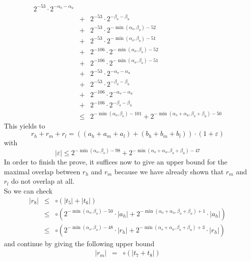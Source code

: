 \documentclass[a4paper,10pt,twoside]{article}
\newenvironment{proof}[1][Proof]{\begin{trivlist}
\item[\hskip \labelsep {\bfseries #1}]}{\end{trivlist}}
\newcommand{\hi}{\ensuremath{\mathit{h}}}
\newcommand{\mi}{\ensuremath{\mathit{m}}}
\newcommand{\lo}{\ensuremath{\mathit{l}}}
\renewcommand{\epsilon}{\varepsilon}
\begin{document}
\begin{proof}
\begin{eqnarray*}
2^{-53} \cdot 2^{-\alpha_o-\alpha_u} \\ & + &
2^{-53} \cdot 2^{-\beta_o-\beta_u} \\ & + &
2^{-53} \cdot 2^{-\min\left(\alpha_o,\beta_o\right)-52} \\ & + & 
2^{-53} \cdot 2^{-\min\left(\alpha_o,\beta_o\right)-51} \\ & + &
2^{-106} \cdot 2^{-\min\left(\alpha_o,\beta_o\right)-52} \\ & + & 
2^{-106} \cdot 2^{-\min\left(\alpha_o,\beta_o\right)-51} \\ & + &
2^{-53} \cdot 2^{-\alpha_o-\alpha_u} \\ & + & 
2^{-53} \cdot 2^{-\beta_o-\beta_u} \\ & + & 
2^{-106} \cdot 2^{-\alpha_o-\alpha_u} \\ & + &
2^{-106} \cdot 2^{-\beta_o-\beta_u} \\ 
& \leq & 2^{-\min\left(\alpha_o,\beta_o\right)-101} + 2^{-\min\left(\alpha_o+\alpha_u,\beta_o+\beta_u\right)-50}
\end{eqnarray*}
This yields to
$$r_\hi + r_\mi + r_\lo = \left( \left( a_\hi + a_\mi + a_\lo \right) + \left( b_\hi + b_\mi + b_\lo \right) \right) \cdot 
\left(1 + \epsilon \right)$$
with
$$\left \vert \epsilon \right \vert \leq 2^{-\min\left(\alpha_o,\beta_o\right)-98} + 2^{-\min\left(\alpha_o+\alpha_u,\beta_o+\beta_u\right)-47}$$
In order to finish the prove, it suffices now to give an upper bound for the
maximal overlap between $r_\hi$ and $r_\mi$ because we have already shown that
$r_\mi$ and $r_\lo$ do not overlap at all.\\
So we can check 
\begin{eqnarray*}
\left \vert r_8 \right \vert & \leq & \circ \left( \left \vert t_5 \right \vert + \left \vert t_6 \right \vert \right) \\
& \leq & \circ \left( 2^{-\min\left(\alpha_o,\beta_o\right)-50} \cdot \left \vert a_\hi \right \vert + 
2^{-\min\left(\alpha_o+\alpha_u,\beta_o+\beta_u\right)+1} \cdot \left \vert a_\hi \right \vert \right)\\
& \leq & \circ \left( 2^{-\min\left(\alpha_o,\beta_o\right)-48} \cdot \left \vert r_\hi \right \vert + 
2^{-\min\left(\alpha_o+\alpha_u,\beta_o+\beta_u\right)+3} \cdot \left \vert r_\hi \right \vert \right)
\end{eqnarray*}
and continue by giving the following upper bound
\begin{eqnarray*}
\left \vert r_\mi \right \vert & = & \circ \left( \left \vert t_7 + t_8 \right \vert \right) \\

\end{eqnarray*}
\end{proof}
\end{document}
